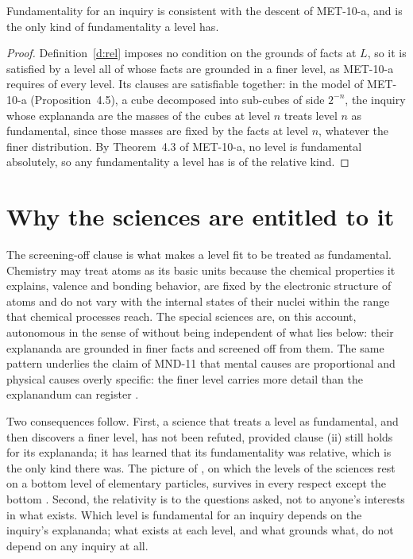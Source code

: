 \documentclass{situationist-preprint}
\begin{document}
\begin{proposition}\label{p:rel}
Fundamentality for an inquiry is consistent with the descent of MET-10-a, and is the only kind of fundamentality a level has.
\end{proposition}

\begin{proof}
Definition~\ref{d:rel} imposes no condition on the grounds of facts at $L$, so it is satisfied by a level all of whose facts are grounded in a finer level, as MET-10-a requires of every level. Its clauses are satisfiable together: in the model of MET-10-a (Proposition~4.5), a cube decomposed into sub-cubes of side $2^{-n}$, the inquiry whose explananda are the masses of the cubes at level $n$ treats level $n$ as fundamental, since those masses are fixed by the facts at level $n$, whatever the finer distribution. By Theorem~4.3 of MET-10-a, no level is fundamental absolutely, so any fundamentality a level has is of the relative kind.
\end{proof}

\section{Why the sciences are entitled to it}

The screening-off clause is what makes a level fit to be treated as fundamental. Chemistry may treat atoms as its basic units because the chemical properties it explains, valence and bonding behavior, are fixed by the electronic structure of atoms and do not vary with the internal states of their nuclei within the range that chemical processes reach. The special sciences are, on this account, autonomous in the sense of \citet{Fodor1974} without being independent of what lies below: their explananda are grounded in finer facts and screened off from them. The same pattern underlies the claim of MND-11 that mental causes are proportional and physical causes overly specific: the finer level carries more detail than the explanandum can register \citep{Yablo1992}.

Two consequences follow. First, a science that treats a level as fundamental, and then discovers a finer level, has not been refuted, provided clause (ii) still holds for its explananda; it has learned that its fundamentality was relative, which is the only kind there was. The picture of \citet{OppenheimPutnam1958}, on which the levels of the sciences rest on a bottom level of elementary particles, survives in every respect except the bottom \citep{Schaffer2003}. Second, the relativity is to the questions asked, not to anyone's interests in what exists. Which level is fundamental for an inquiry depends on the inquiry's explananda; what exists at each level, and what grounds what, do not depend on any inquiry at all.
\end{document}

